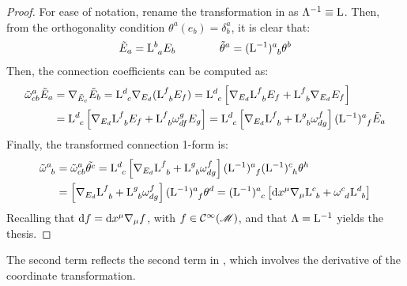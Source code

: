 \begin{proofbox}
  \begin{proof}
    For ease of notation, rename the transformation in  as $ \Lambda^{-1} \equiv \mathrm{L} $. Then, from the orthogonality condition $ \theta^a (e_b) = \delta^a_b $, it is clear that:
    \begin{equation*}
      \tilde{E}_a = \tensor{\mt{L}}{^b_a} E_b
      \qquad \qquad
      \tilde{\theta}^a = \tensor{(\mt{L}^{-1})}{^a_b} \theta^b
    \end{equation*}
    Then, the connection coefficients can be computed as:
    \begin{equation*}
      \begin{split}
        \tilde{\omega}^a_{cb} \tilde{E}_a
        & = \na_{\tilde{E}_c} \tilde{E}_b = \tensor{\mt{L}}{^d_c} \na_{E_d} (\tensor{\mt{L}}{^f_b} E_f) = \tensor{\mt{L}}{^d_c} \left[ \na_{E_d} \tensor{\mt{L}}{^f_b} E_f + \tensor{\mt{L}}{^f_b} \na_{E_d} E_f \right] \\
        & = \tensor{\mt{L}}{^d_c} \left[ \na_{E_d} \tensor{\mt{L}}{^f_b} E_f + \tensor{\mt{L}}{^f_b} \omega^g_{df} E_g \right] = \tensor{\mt{L}}{^d_c} \left[ \na_{E_d} \tensor{\mt{L}}{^f_b} + \tensor{\mt{L}}{^g_b} \omega^f_{dg} \right] \tensor{(\mt{L}^{-1})}{^a_f} \tilde{E}_a
      \end{split}
    \end{equation*}
    Finally, the transformed connection 1-form is:
    \begin{equation*}
      \begin{split}
        \tensor{\tilde{\omega}}{^a_b}
        & = \tilde{\omega}^a_{cb} \tilde{\theta^c} = \tensor{\mt{L}}{^d_c} \left[ \na_{E_d} \tensor{\mt{L}}{^f_b} + \tensor{\mt{L}}{^g_b} \omega^f_{dg} \right] \tensor{(\mt{L}^{-1})}{^a_f} \tensor{(\mt{L}^{-1})}{^c_h} \theta^h \\
        & = \left[ \na_{E_d} \tensor{\mt{L}}{^f_b} + \tensor{\mt{L}}{^g_b} \omega^f_{dg} \right] \tensor{(\mt{L}^{-1})}{^a_f} \theta^d = \tensor{(\mt{L}^{-1})}{^a_c} \left[ \dd x^\mu \na_\mu \tensor{\mt{L}}{^c_b} + \tensor{\omega}{^c_d} \tensor{\mt{L}}{^d_b} \right]
      \end{split}
    \end{equation*}
    Recalling that $ \mathrm{d} f = \mathrm{d} x^\mu \nabla_\mu f $, with $ f \in \mathcal{C}^{\infty}(\mathscr{M}) $, and that $ \Lambda = \mathrm{L}^{-1} $ yields the thesis.
  \end{proof}
\end{proofbox}

The second term reflects the second term in , which involves the derivative of the coordinate transformation.

